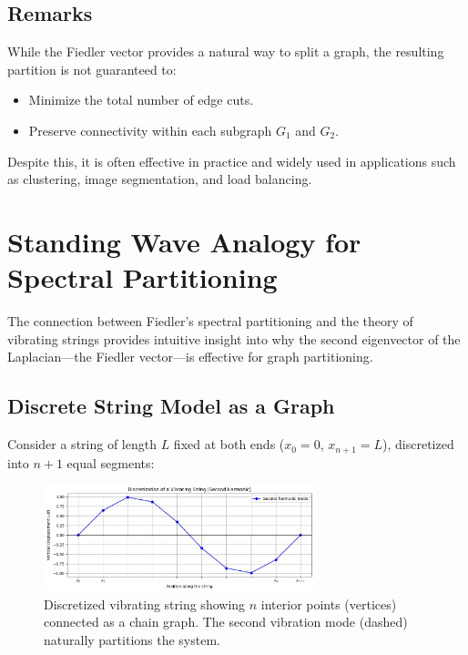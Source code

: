 \documentclass[hidelinks,12pt]{article}
\begin{document}
\subsection*{Remarks}
While the Fiedler vector provides a natural way to split a graph, the resulting partition is not guaranteed to:
\begin{itemize}
    \item Minimize the total number of edge cuts.
    \item Preserve connectivity within each subgraph \( G_1 \) and \( G_2 \).
\end{itemize}

\noindent Despite this, it is often effective in practice and widely used in applications such as clustering, image segmentation, and load balancing.
\newpage
\section{Standing Wave Analogy for Spectral Partitioning}

The connection between Fiedler's spectral partitioning and the theory of vibrating strings provides intuitive insight into why the second eigenvector of the Laplacian—the Fiedler vector—is effective for graph partitioning.

\subsection*{Discrete String Model as a Graph}

Consider a string of length \( L \) fixed at both ends (\( x_0 = 0 \), \( x_{n+1} = L \)), discretized into \( n+1 \) equal segments:

\begin{figure}[h]
    \centering
    \includegraphics[width=0.7\textwidth]{figures/image02.jpg}
    \caption{Discretized vibrating string showing \( n \) interior points (vertices) connected as a chain graph. The second vibration mode (dashed) naturally partitions the system.}
    \label{fig:string}
\end{figure}
\end{document}
